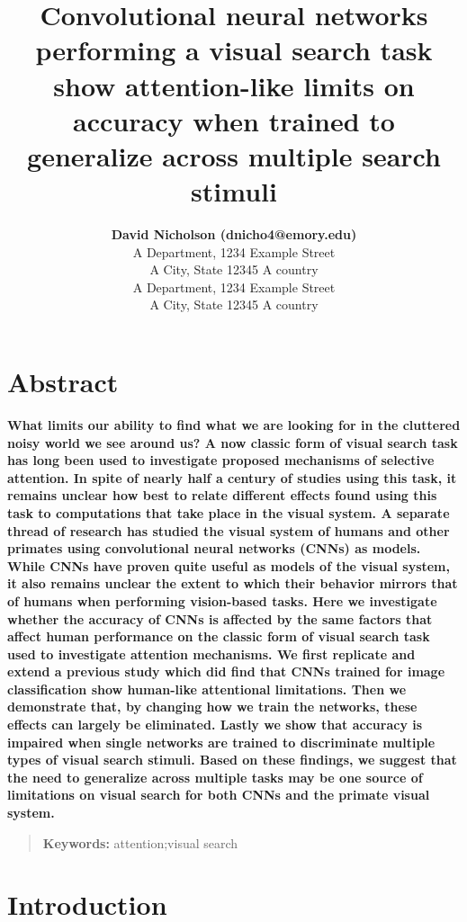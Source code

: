 \documentclass[10pt,letterpaper]{article}
\title{Convolutional neural networks performing a visual search task show attention-like 
limits on accuracy when trained to generalize across multiple search stimuli}
\author{{\large \bf David Nicholson (dnicho4@emory.edu)} \\
  A Department, 1234 Example Street\\
A City, State 12345 A country
  \AND {\large \bf Astrid Prinz (AnotherPerson@this.planet.edu)} \\
  A Department, 1234 Example Street\\
A City, State 12345 A country}
\begin{document}
\maketitle


\section{Abstract}
{
\bf
What limits our ability to find what we are looking for in the cluttered noisy world we 
see around us? A now classic form of visual search task has long been used to investigate 
proposed mechanisms of selective attention. In spite of nearly half a century of studies 
using this task, it remains unclear how best to relate different effects found using this 
task to computations that take place in the visual system. A separate thread of research 
has studied the visual system of humans and other primates using convolutional neural 
networks (CNNs) as models. While CNNs have proven quite useful as models of the visual 
system, it also remains unclear the extent to which their behavior mirrors that of 
humans when performing vision-based tasks. Here we investigate whether the accuracy of 
CNNs is affected by the same factors that affect human performance on the classic form of 
visual search task used to investigate attention mechanisms. We first replicate and extend
a previous study which did find that CNNs trained for image classification show human-like
attentional limitations. Then we demonstrate that, by changing how we train the networks, 
these effects can largely be eliminated. Lastly we show that accuracy is impaired when 
single networks are trained to discriminate multiple types of visual search stimuli. Based
on these findings, we suggest that the need to generalize across multiple tasks may be one 
source of limitations on visual search for both CNNs and the primate visual system.
}
\begin{quote}
\small
\textbf{Keywords:} 
attention;visual search
\end{quote}

\section{Introduction}
\end{document}
